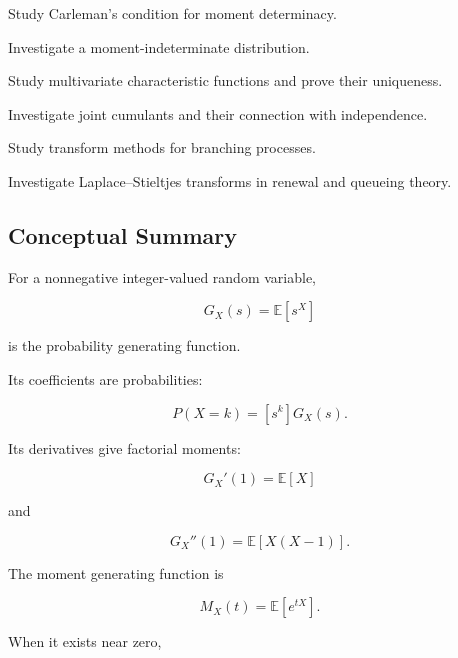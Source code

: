 \begin{exercise}[4]
Study Carleman's condition for moment determinacy.
\end{exercise}

\begin{exercise}[4]
Investigate a moment-indeterminate distribution.
\end{exercise}

\begin{exercise}[4]
Study multivariate characteristic functions and prove their uniqueness.
\end{exercise}

\begin{exercise}[4]
Investigate joint cumulants and their connection with independence.
\end{exercise}

\begin{exercise}[4]
Study transform methods for branching processes.
\end{exercise}

\begin{exercise}[4]
Investigate Laplace--Stieltjes transforms in renewal and queueing theory.
\end{exercise}

\subsection{Conceptual Summary}
\label{subsec:probability-transforms-summary}

For a nonnegative integer-valued random variable,

\[
\boxed{
G_X(s)
=
\mathbb{E}[s^X]
}
\]

is the probability generating function.

Its coefficients are probabilities:

\[
\boxed{
P(X=k)
=
[s^k]G_X(s).
}
\]

Its derivatives give factorial moments:

\[
\boxed{
G_X'(1)=\mathbb{E}[X]
}
\]

and

\[
\boxed{
G_X''(1)=\mathbb{E}[X(X-1)].
}
\]

The moment generating function is

\[
\boxed{
M_X(t)
=
\mathbb{E}[e^{tX}].
}
\]

When it exists near zero,

